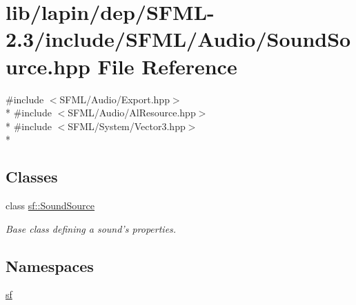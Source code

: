 \hypertarget{lapin_2dep_2_s_f_m_l-2_83_2include_2_s_f_m_l_2_audio_2_sound_source_8hpp}{\section{lib/lapin/dep/\-S\-F\-M\-L-\/2.3/include/\-S\-F\-M\-L/\-Audio/\-Sound\-Source.hpp File Reference}
\label{lapin_2dep_2_s_f_m_l-2_83_2include_2_s_f_m_l_2_audio_2_sound_source_8hpp}
}
{\ttfamily \#include $<$S\-F\-M\-L/\-Audio/\-Export.\-hpp$>$}\\*
{\ttfamily \#include $<$S\-F\-M\-L/\-Audio/\-Al\-Resource.\-hpp$>$}\\*
{\ttfamily \#include $<$S\-F\-M\-L/\-System/\-Vector3.\-hpp$>$}\\*
\subsection*{Classes}
\begin{DoxyCompactItemize}
\item 
class \hyperlink{classsf_1_1_sound_source}{sf\-::\-Sound\-Source}
\begin{DoxyCompactList}\small\item\em Base class defining a sound's properties. \end{DoxyCompactList}\end{DoxyCompactItemize}
\subsection*{Namespaces}
\begin{DoxyCompactItemize}
\item 
\hyperlink{namespacesf}{sf}
\end{DoxyCompactItemize}
